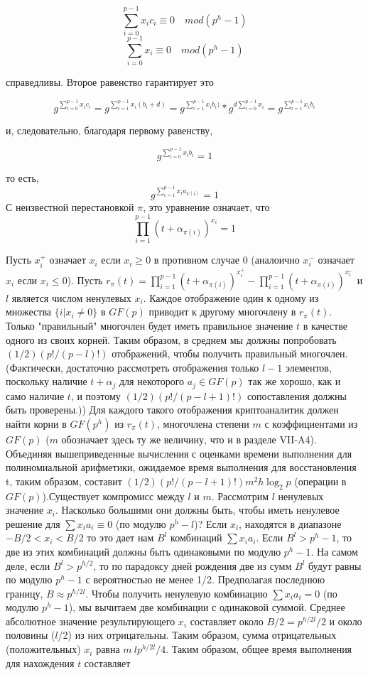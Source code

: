\documentclass[a4paper,12pt]{article}
\begin{document}
$$\sum_{i=0}^{p-1} x_i c_i \equiv 0 \quad mod(p^h -1)$$
$$\sum_{i=0}^{p-1} x_i \equiv 0 \quad mod(p^h -1)$$

справедливы. Второе равенство гарантирует это

$$g^{\sum_{i=0}^{p-1} x_i c_i} = g^{\sum_{i=1}^{p-1} x_i (b_i +d)} = g^{\sum_{i=1}^{p-1} x_i b_i)} * g^{d \sum_{i=0}^{p-1} x_i} = g^{\sum_{i=1}^{p-1} x_i b_i}$$

 и, следовательно, благодаря первому равенству,

$$g^{\sum_{i=0}^{p-1} x_i b_i} = 1$$

то есть, 
$$g^{\sum_{i=1}^{p-1} x_i a_{\pi(i)}} = 1$$
С неизвестной перестановкой $\pi$, это уравнение означает, что 
$$\prod_{i=1}^{p-1} (t+ \alpha_{\pi(i)})^{x_i} = 1$$

Пусть $x_i^{+}$ означает $x_i$ если $x_i \geq 0$ в противном случае 0 (аналоично $x_i^{-}$ означает $x_i$ если $x_i \leq 0$). Пусть $r_{\pi}(t) = \prod_{i=1}^{p-1} (t+ \alpha_{\pi(i)})^{x_i^{+}} - \prod_{i=1}^{p-1} (t+ \alpha_{\pi(i)})^{x_i^{-}}$ и $l$ является числом ненулевых $x_i$. Каждое отображение один к одному из множества $\{ i|x_i \neq 0 \}$ в $GF(p)$ приводит к другому многочлену в $r_{\pi}(t)$. Только "правильный" многочлен будет иметь правильное значение $t$ в качестве одного из своих корней. Таким образом, в среднем мы должны попробовать $(1/2)(p!/(p-l)!)$ отображений, чтобы получить правильный многочлен. (Фактически, достаточно рассмотреть отображения только $l - 1$ элементов, поскольку наличие $t + \alpha_j$ для некоторого $a_j \in GF(p)$ так же хорошо, как и само наличие $t$, и поэтому $(1/2)(p!/(p - l + 1)!)$ сопоставления должны быть проверены.)) \newline
\indent Для каждого такого отображения криптоаналитик должен найти корни в $GF(p^h)$ из $r_{\pi}(t)$, многочлена степени $m$ с коэффициентами из $GF(p)$ ($m$ обозначает здесь ту же величину, что и в разделе VII-A4). Объединяя вышеприведенные вычисления с оценками времени выполнения для полиномиальной арифметики, ожидаемое время выполнения для восстановления t, таким образом, составит $(1/2)(p!/(p-l+1)!)m^2 h\log_2 p$ (операции в $GF(p)$).Существует компромисс между $l$ и $m$. Рассмотрим $l$ ненулевых значение $x_i$. Насколько большими они должны быть, чтобы иметь ненулевое решение для $\sum  x_i a_i \equiv 0$ (по модулю $p^h- l$)? Если $x_i$, находятся в диапазоне $- B/2 < x_i < B/2$ то это дает нам $B^l$ комбинаций $\sum x_i a_i$. Если $B^l > p^h - 1$, то две из этих комбинаций должны быть одинаковыми по модулю $p^h - 1$. На самом деле, если $B^l > p^{h/2}$, то по парадоксу дней рождения две из сумм $B^l$ будут равны по модулю $p^h - 1$ с вероятностью не менее 1/2. Предполагая последнюю границу, $B \approx p^{h/2l}$. Чтобы получить ненулевую комбинацию $\sum x_i a_i = 0$ (по модулю $p^h - 1$), мы вычитаем две комбинации с одинаковой суммой. Среднее абсолютное значение результирующего $x_i$ составляет около $B/2 = p^{h/2l}/2$ и около половины ($l$/2) из них отрицательны. Таким образом, сумма отрицательных (положительных) $x_i$ равна $m~lp^{h/2l}/4$. Таким образом, общее время выполнения для нахождения $t$ составляет 
\end{document}
